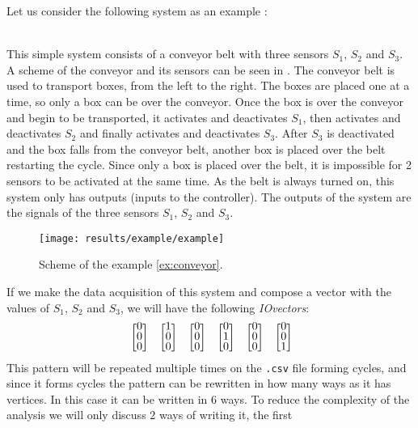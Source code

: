  Let us consider the following system as an example : 
\begin{example}~\\
  \label{ex:conveyor}
 This simple system consists of a conveyor belt with three sensors $S_1$, $S_2$ and
 $S_3$. A scheme of the conveyor and its sensors can be seen in
 . The conveyor belt is used to transport boxes, from
 the left to the right. The boxes are placed one at a time, so only a box can be
 over the conveyor. Once the box is over
 the conveyor and begin to be transported, it activates and deactivates $S_1$,
 then activates and deactivates $S_2$ and
 finally activates and deactivates $S_3$. After $S_3$ is deactivated and the box
 falls from the conveyor belt, another
 box is placed over the
 belt restarting the cycle. Since only a box is placed over the belt,
 it is impossible for 2 sensors to be activated at the same time.  As the belt is always turned on, this system
 only has outputs (inputs to the controller). The outputs of the system are the signals of the three sensors $S_1$, $S_2$ and
 $S_3$.
\end{example}
\begin{figure}[H]
  \centering
  \texttt{[image: results/example/example]}
  \caption{Scheme of the example \ref{ex:conveyor}.}
    \label{fig:schemeExConveyor}
\end{figure}
If we make the data acquisition of this system and compose a vector with the
values of $S_1$, $S_2$ and $S_3$, we will have the following \emph{IOvectors}:
\begin{align}
  \label{motif}
\colvec{0\\0\\0}\colvec{1\\0\\0}\colvec{0\\0\\0}\colvec{0\\1\\0}\colvec{0\\0\\0}\colvec{0\\0\\1}
\end{align}
This pattern will be repeated multiple times on the \verb|.csv| file forming
cycles, and since it forms cycles the pattern can be rewritten in how many ways as
it has vertices. In this case it can be written in 6 ways. To reduce the
complexity of the analysis we will only discuss 2 ways of writing it, the first
